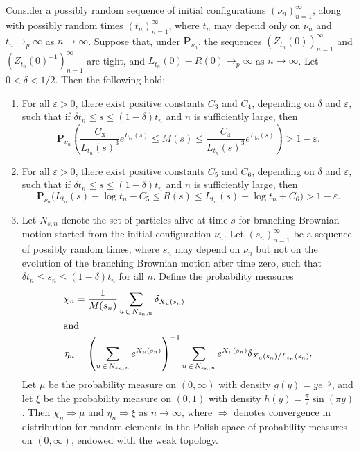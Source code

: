 \documentclass[10pt]{amsart}
\theoremstyle{definition}\newtheorem{defi}[theo]{Definition}\newtheorem{rema}[theo]{Remark}\newtheorem{exam}[theo]{Example}\newtheorem{exem}[theo]{Example}\newtheorem{nota}[theo]{Notation}
\newcommand*\eps{\varepsilon}
\renewcommand*\P{\mathbf{P}}
\newcommand{\1} {\mathds{1}}
\begin{document}
\begin{prop}\label{configpropnew}
Consider a possibly random sequence of initial configurations $(\nu_n)_{n=1}^{\infty}$, along with possibly random times $(t_n)_{n=1}^{\infty}$, where $t_n$ may depend only on $\nu_n$ and $t_n \rightarrow_p \infty$ as $n \rightarrow \infty$. Suppose that, under $\P_{\nu_n}$, the sequences $(Z_{t_n}(0))_{n=1}^{\infty}$ and $(Z_{t_n}(0)^{-1})_{n=1}^{\infty}$ are tight, and $L_{t_n}(0) - R(0) \rightarrow_p \infty$ as $n \rightarrow \infty$. Let $0 < \delta < 1/2$. Then the following hold:
\begin{enumerate}
\item\label{prop2.6.1} For all $\eps > 0$, there exist positive constants $C_3$ and $C_4$, depending on $\delta$ and $\eps$, such that if $\delta t_n \leq s \leq (1 - \delta)t_n$ and $n$ is sufficiently large, then
\begin{equation}\label{configconc1}
\P_{\nu_n} \left(\frac{C_3}{L_{t_n}(s)^3} e^{L_{t_n}(s)} \leq M(s) \leq \frac{C_4}{L_{t_n}(s)^3} e^{L_{t_n}(s)} \right) > 1 - \eps.
\end{equation}

\item\label{prop2.6.2} For all $\eps > 0$, there exist positive constants $C_5$ and $C_6$, depending on $\delta$ and $\eps$, such that if $\delta t_n \leq s \leq (1 - \delta)t_n$ and $n$ is sufficiently large, then
\begin{equation}\label{configconc2}
\P_{\nu_n} \big(L_{t_n}(s) - \log t_n - C_5 \leq R(s) \leq L_{t_n}(s) - \log t_n + C_6 \big) > 1 - \eps.
\end{equation}

\item\label{prop2.6.3} Let $N_{s,n}$ denote the set of particles alive at time $s$ for branching Brownian motion started from the initial configuration $\nu_n$. Let $(s_n)_{n=1}^{\infty}$ be a sequence of possibly random times, where $s_n$ may depend on $\nu_n$ but not on the evolution of the branching Brownian motion after time zero, such that $\delta t_n \leq s_n \leq (1 - \delta) t_n$ for all $n$. Define the probability measures
\begin{align*}
\chi_n &= \frac{1}{M(s_n)} \sum_{u\,\in\,N_{s_n,n}} \delta_{X_u(s_n)}
\\
\intertext{and}
\eta_n &= \left(\sum_{u\,\in\,N_{s_n,n}} e^{X_u(s_n)} \right)^{-1} \sum_{u\,\in\,N_{s_n,n}} e^{X_u(s_n)} \delta_{X_u(s_n)/L_{t_n}(s_n)}.
\end{align*}
Let $\mu$ be the probability measure on $(0, \infty)$ with density $g(y) = ye^{-y}$, and let $\xi$ be the probability measure on $(0,1)$ with density $h(y) = \frac{\pi}{2} \sin(\pi y)$. Then $\chi_n \Rightarrow \mu$ and $\eta_n \Rightarrow \xi$ as $n \rightarrow \infty$, where $\Rightarrow$ denotes convergence in distribution for random elements in the Polish space of probability measures on $(0, \infty)$, endowed with the weak topology.
\end{enumerate}
\end{prop}
\end{document}
